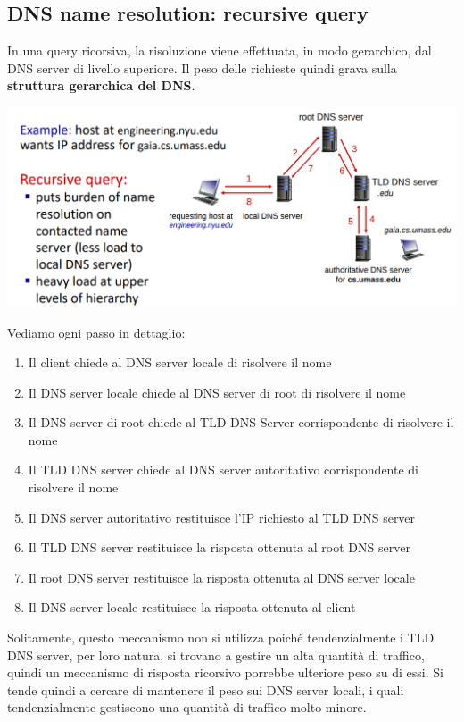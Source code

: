 \documentclass[12pt]{article}
\begin{document}
\subsection{DNS name resolution: recursive query}
In una query ricorsiva, la risoluzione viene effettuata, in modo gerarchico, dal DNS server di livello superiore.
Il peso delle richieste quindi grava sulla \textbf{struttura gerarchica del DNS}.
\begin{center}
    \includegraphics[width = 1\linewidth]{Images/35.png}
\end{center}
Vediamo ogni passo in dettaglio:
\begin{enumerate}
    \item Il client chiede al DNS server locale di risolvere il nome
    \item Il DNS server locale chiede al DNS server di root di risolvere il nome
    \item Il DNS server di root chiede al TLD DNS Server corrispondente di risolvere il nome
    \item Il TLD DNS server chiede al DNS server autoritativo corrispondente di risolvere il nome
    \item Il DNS server autoritativo restituisce l'IP richiesto al TLD DNS server
    \item Il TLD DNS server restituisce la risposta ottenuta al root DNS server
    \item Il root DNS server restituisce la risposta ottenuta al DNS server locale
    \item Il DNS server locale restituisce la risposta ottenuta al client
\end{enumerate}
Solitamente, questo meccanismo non si utilizza poiché tendenzialmente i TLD DNS server, per loro natura, si trovano a gestire
un alta quantità di traffico, quindi un meccanismo di risposta ricorsivo porrebbe ulteriore peso su di essi. Si tende quindi
a cercare di mantenere il peso sui DNS server locali, i quali tendenzialmente gestiscono una quantità di traffico molto minore.
\end{document}
